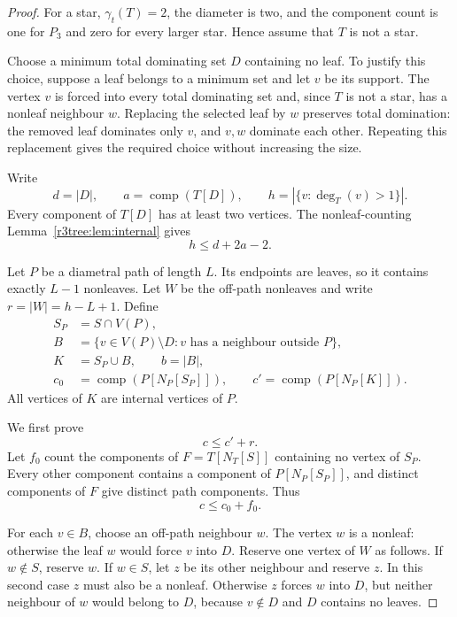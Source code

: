 \documentclass[11pt,a4paper]{article}
\theoremstyle{remark}
\begin{document}
\begin{proof}
For a star, $\gamma_t(T)=2$, the diameter is two, and the component count
is one for $P_3$ and zero for every larger star.  Hence assume that $T$
is not a star.

Choose a minimum total dominating set $D$ containing no leaf.  To justify
this choice, suppose a leaf belongs to a minimum set and let $v$ be its
support.  The vertex $v$ is forced into every total dominating set and,
since $T$ is not a star, has a nonleaf neighbour $w$.  Replacing the
selected leaf by $w$ preserves total domination: the removed leaf
dominates only $v$, and $v,w$ dominate each other.  Repeating this
replacement gives the required choice without increasing the size.

Write
\[
 d=|D|,\qquad a=\operatorname{comp}(T[D]),\qquad
 h=|\{v:\deg_T(v)>1\}|.
\]
Every component of $T[D]$ has at least two vertices.  The nonleaf-counting
Lemma~\ref{r3tree:lem:internal} gives
\begin{equation}
 h\le d+2a-2.
 \label{r6:242-nonleaf}
\end{equation}

Let $P$ be a diametral path of length $L$.  Its endpoints are leaves, so
it contains exactly $L-1$ nonleaves.  Let $W$ be the off-path nonleaves
and write $r=|W|=h-L+1$.  Define
\[
 \begin{split}
 S_P&=S\cap V(P),\\
 B&=\{v\in V(P)\setminus D:
                v\text{ has a neighbour outside }P\},\\
 K&=S_P\cup B,\qquad b=|B|,\\
 c_0&=\operatorname{comp}(P[N_P[S_P]]),\qquad
 c'=\operatorname{comp}(P[N_P[K]]).
 \end{split}
\]
All vertices of $K$ are internal vertices of $P$.

We first prove
\begin{equation}
 c\le c'+r.
 \label{r6:242-path-comparison}
\end{equation}
Let $f_0$ count the components of $F=T[N_T[S]]$ containing no vertex of
$S_P$.  Every other component contains a component of $P[N_P[S_P]]$,
and distinct components of $F$ give distinct path components.  Thus
\begin{equation}
 c\le c_0+f_0.
 \label{r6:242-components-initial}
\end{equation}

For each $v\in B$, choose an off-path neighbour $w$.  The vertex $w$ is
a nonleaf: otherwise the leaf $w$ would force $v$ into $D$.  Reserve
one vertex of $W$ as follows.  If $w\notin S$, reserve $w$.  If
$w\in S$, let $z$ be its other neighbour and reserve $z$.  In this
second case $z$ must also be a nonleaf.  Otherwise $z$ forces $w$ into
$D$, but neither neighbour of $w$ would belong to $D$, because
$v\notin D$ and $D$ contains no leaves.


\end{proof}
\end{document}
